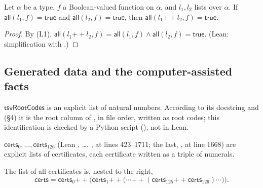\begin{lemma}\label{cb:lem:append}
Let $\alpha$ be a type, $f$ a Boolean-valued function on $\alpha$, and $l_1,l_2$ lists over $\alpha$. If
$\mathsf{all}(l_1,f)=\mathsf{true}$ and $\mathsf{all}(l_2,f)=\mathsf{true}$, then
$\mathsf{all}(l_1\mathbin{+\!\!+}l_2,f)=\mathsf{true}$.
\end{lemma}

\begin{proof}
By (L1), $\mathsf{all}(l_1\mathbin{+\!\!+}l_2,f)=\mathsf{all}(l_1,f)\wedge\mathsf{all}(l_2,f)=\mathsf{true}$. (Lean:
simplification with .)
\end{proof}

\subsection{Generated data and the computer-assisted facts}\label{cb:sec:data}

\begin{definition}\label{cb:def:tsv}
$\mathsf{tsvRootCodes}$ is an explicit list of natural numbers. According to its docstring and
 (\S4) it is the root column of , in file order,
written as root codes; this identification is checked by a Python script (), not in
Lean.
\end{definition}

\begin{definition}\label{cb:def:certsN}
$\mathsf{certs}_0,\dots,\mathsf{certs}_{126}$ (Lean , \dots, , at lines 423--1711; the
last, , at line 1668) are explicit lists of certificates, each certificate written as a triple of
numerals.
\end{definition}

\begin{definition}\label{cb:def:certs}
The list of all certificates is, nested to the right,
\[
\mathsf{certs}=\mathsf{certs}_0\mathbin{+\!\!+}\big(\mathsf{certs}_1\mathbin{+\!\!+}\big(\cdots
\mathbin{+\!\!+}(\mathsf{certs}_{125}\mathbin{+\!\!+}\mathsf{certs}_{126})\cdots\big)\big).
\]
\end{definition}

